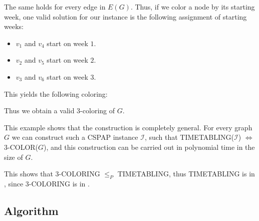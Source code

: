 The same holds for every edge in $E(G)$. Thus, if we color a node by its starting week, one valid solution for our instance is the following assignment of starting weeks:

\begin{itemize}
\item $v_1$ and $v_4$ start on week $1$.
\item $v_2$ and $v_5$ start on week $2$.
\item $v_3$ and $v_6$ start on week $3$.
\end{itemize}

This yields the following coloring:

\begin{center}
\end{center}

Thus we obtain a valid 3-coloring of $G$.

This example shows that the construction is completely general. For every graph $G$ we can construct such a CSPAP instance $\mathcal{I}$, such that TIMETABLING($\mathcal{I}$) $\iff$ 3-COLOR($G$), and this construction can be carried out in polynomial time in the size of $G$.

This shows that 3-COLORING $\le_P$ TIMETABLING, thus TIMETABLING is in \nph, since 3-COLORING is in \nph.

\newpage

\subsection{Algorithm}

